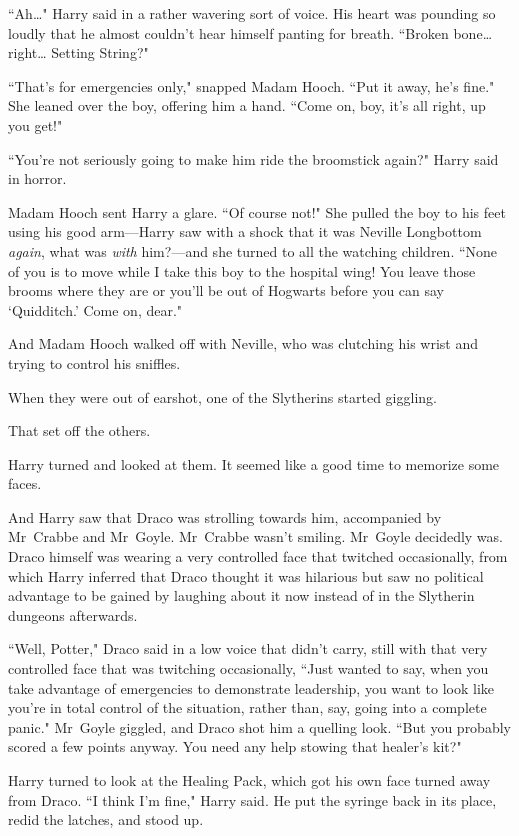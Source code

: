 ``Ah{\ldots}" Harry said in a rather wavering sort of voice. His heart was pounding so loudly that he almost couldn't hear himself panting for breath. ``Broken bone{\ldots} right{\ldots} Setting String?"

``That's for emergencies only," snapped Madam Hooch. ``Put it away, he's fine." She leaned over the boy, offering him a hand. ``Come on, boy, it's all right, up you get!"

``You're not seriously going to make him ride the broomstick again?" Harry said in horror.

Madam Hooch sent Harry a glare. ``Of course not!" She pulled the boy to his feet using his good arm—Harry saw with a shock that it was Neville Longbottom \emph{again}, what was \emph{with} him?—and she turned to all the watching children. ``None of you is to move while I take this boy to the hospital wing! You leave those brooms where they are or you'll be out of Hogwarts before you can say `Quidditch.' Come on, dear."

And Madam Hooch walked off with Neville, who was clutching his wrist and trying to control his sniffles.

When they were out of earshot, one of the Slytherins started giggling.

That set off the others.

Harry turned and looked at them. It seemed like a good time to memorize some faces.

And Harry saw that Draco was strolling towards him, accompanied by Mr~Crabbe and Mr~Goyle. Mr~Crabbe wasn't smiling. Mr~Goyle decidedly was. Draco himself was wearing a very controlled face that twitched occasionally, from which Harry inferred that Draco thought it was hilarious but saw no political advantage to be gained by laughing about it now instead of in the Slytherin dungeons afterwards.

``Well, Potter," Draco said in a low voice that didn't carry, still with that very controlled face that was twitching occasionally, ``Just wanted to say, when you take advantage of emergencies to demonstrate leadership, you want to look like you're in total control of the situation, rather than, say, going into a complete panic." Mr~Goyle giggled, and Draco shot him a quelling look. ``But you probably scored a few points anyway. You need any help stowing that healer's kit?"

Harry turned to look at the Healing Pack, which got his own face turned away from Draco. ``I think I'm fine," Harry said. He put the syringe back in its place, redid the latches, and stood up.

